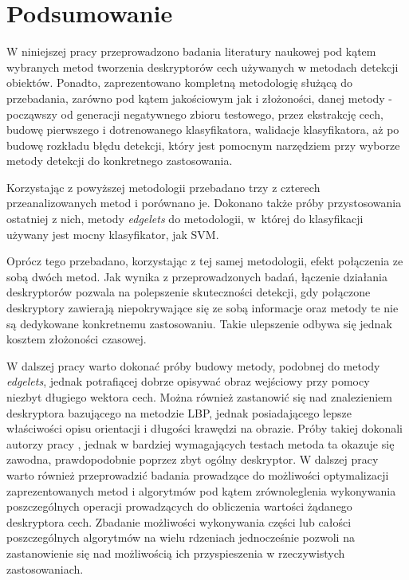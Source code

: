 \chapter{Podsumowanie}
\label{cha:wnioski}

W niniejszej pracy przeprowadzono badania literatury naukowej pod kątem wybranych metod tworzenia deskryptorów cech używanych w metodach detekcji obiektów. Ponadto, zaprezentowano kompletną metodologię służącą do przebadania, zarówno pod kątem jakościowym jak i złożoności, danej metody - począwszy od generacji negatywnego zbioru testowego, przez ekstrakcję cech, budowę pierwszego i dotrenowanego klasyfikatora, walidacje klasyfikatora, aż po budowę rozkładu błędu detekcji, który jest pomocnym narzędziem przy wyborze metody detekcji do konkretnego zastosowania.

Korzystając z powyższej metodologii przebadano trzy z czterech przeanalizowanych metod i porównano je. Dokonano także próby przystosowania ostatniej z nich, metody \textit{edgelets} do metodologii, w~której do klasyfikacji używany jest mocny klasyfikator, jak SVM.

Oprócz tego przebadano, korzystając z tej samej metodologii, efekt połączenia ze sobą dwóch metod. Jak wynika z przeprowadzonych badań, łączenie działania deskryptorów pozwala na polepszenie skuteczności detekcji, gdy połączone deskryptory zawierają niepokrywające się ze sobą informacje oraz metody te nie są dedykowane konkretnemu zastosowaniu. Takie ulepszenie odbywa się jednak kosztem złożoności czasowej.

W dalszej pracy warto dokonać próby budowy metody, podobnej do metody \textit{edgelets}, jednak potrafiącej dobrze opisywać obraz wejściowy przy pomocy niezbyt długiego wektora cech.
Można również zastanowić się nad znalezieniem deskryptora bazującego na metodzie LBP, jednak posiadającego lepsze właściwości opisu orientacji i długości krawędzi na obrazie. Próby takiej dokonali autorzy pracy \cite{Zhao07}, jednak w bardziej wymagających testach metoda ta okazuje się zawodna, prawdopodobnie poprzez zbyt ogólny deskryptor.
W dalszej pracy warto również przeprowadzić badania prowadzące do możliwości optymalizacji zaprezentowanych metod i algorytmów pod kątem zrównoleglenia wykonywania poszczególnych operacji prowadzących do obliczenia wartości żądanego deskryptora cech. Zbadanie możliwości wykonywania części lub całości poszczególnych algorytmów na wielu rdzeniach jednocześnie pozwoli na zastanowienie się nad możliwością ich przyspieszenia w rzeczywistych zastosowaniach.